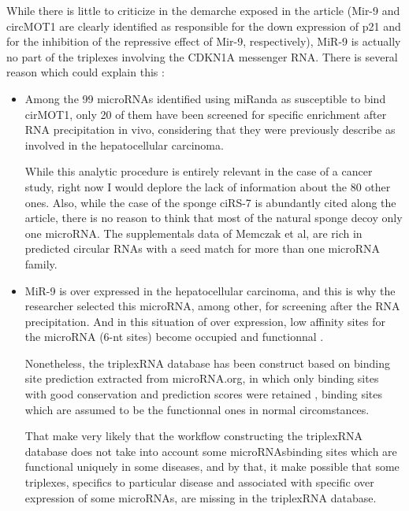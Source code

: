 \documentclass[a4paper,12pt]{report}
\begin{document}
While there is little to criticize in the demarche exposed in the article (Mir-9 and circMOT1 are clearly identified as responsible for the down expression of p21 and for the inhibition of the repressive effect of Mir-9, respectively), MiR-9 is actually no part of the triplexes involving the CDKN1A messenger RNA. There is several reason which could explain this :

\begin{itemize}
	
	
\item Among the 99 microRNAs identified using miRanda as susceptible to bind cirMOT1, only 20 of them have been screened for specific enrichment after RNA precipitation in vivo, considering that they were previously describe as involved in the hepatocellular carcinoma.
	
While this analytic procedure is entirely relevant in the case of a cancer study, right now I would deplore the lack of information about the 80 other ones. Also, while the case of the sponge ciRS-7\cite{mir7} is abundantly cited along the article\cite{carcinoma}, there is no reason to think that most of the natural sponge decoy only one microRNA. The supplementals data of Memczak et al,\cite{mir7} are rich in predicted circular RNAs with a seed match for more than one microRNA family. 
	 
\item MiR-9 is over expressed in the hepatocellular carcinoma, and this is why the researcher selected this microRNA, among other, for screening after the RNA precipitation. And in this situation of over expression, low affinity sites for the microRNA (6-nt sites) become occupied and functionnal \cite{mir9}. 

Nonetheless, the triplexRNA database has been construct based on binding site prediction extracted from microRNA.org, in which only binding sites with good conservation and prediction scores were retained \cite{triplex}, binding sites which are assumed to be the functionnal ones in normal circomstances.

That make very likely that the workflow constructing the triplexRNA database does not take into account some microRNAsbinding sites which are functional uniquely in some diseases, and by that, it make possible that some triplexes, specifics to particular disease and associated with specific over expression of some microRNAs, are missing in the triplexRNA database.

\end{itemize}
\end{document}
